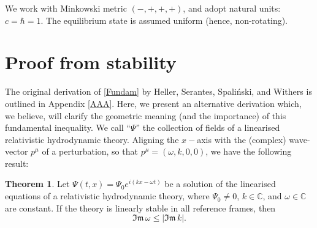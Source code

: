 \documentclass[a4paper, amsfonts, amssymb, amsmath, reprint, showkeys, nofootinbib, twoside,notitlepage]{revtex4-1}
\theoremstyle{definition}
\theoremstyle{theorem}
\newtheorem{theorem}{Theorem}
\theoremstyle{corollary}
\begin{document}
We work with Minkowski metric $(-,+,+,+)$, and adopt natural units: $c=\hbar=1$. The equilibrium state is assumed uniform (hence, non-rotating).



  


\section{Proof from stability}

The original derivation of \eqref{Fundam} by Heller, Serantes, Spali\'{n}ski, and Withers \cite{Heller2022}  is outlined in Appendix \ref{AAA}. Here, we present an alternative derivation which, we believe, will clarify the geometric meaning (and the importance) of this fundamental inequality.
We call ``$\Psi$'' the collection of fields of a linearised relativistic hydrodynamic theory. Aligning the $x-$axis with the (complex) wave-vector $p^\mu$ of a perturbation, so that $p^\mu=(\omega,k,0,0)$, we have the following result:
\begin{theorem}\label{theo1}
Let $\Psi(t,x) = \Psi_0 e^{i(kx-\omega t)}$ be a solution of the linearised equations of a relativistic hydrodynamic theory, where $\Psi_0 \neq 0$, $k \in \mathbb{C}$, and $\omega \in \mathbb{C}$ are constant. If the theory is linearly stable in all reference frames, then
\begin{equation}
\mathfrak{Im}\, \omega \leq |\mathfrak{Im} \, k| .
\end{equation}
\end{theorem}
\end{document}
